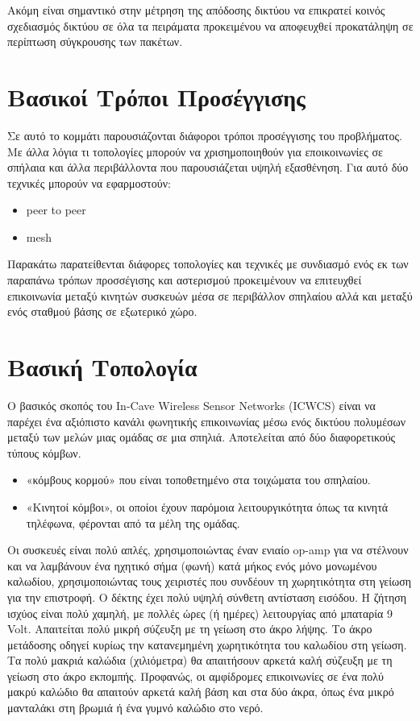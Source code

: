 \documentclass[12pt]{article}
\begin{document}
\begin{multicols*}{2}
        Ακόμη είναι σημαντικό στην μέτρηση της απόδοσης δικτύου να επικρατεί κοινός
        σχεδιασμός δικτύου σε όλα τα πειράματα προκειμένου να αποφευχθεί προκατάληψη
        σε περίπτωση σύγκρουσης των πακέτων.

        
        
    \section{\normalsize \textsf{Βασικοί Τρόποι Προσέγγισης}} Σε αυτό το κομμάτι
        παρουσιάζονται διάφοροι τρόποι προσέγγισης του προβλήματος. Με άλλα λόγια τι
        τοπολογίες μπορούν να χρισημοποιηθούν για εποικοινωνίες σε σπήλαια και άλλα
        περιβάλλοντα που παρουσιάζεται υψηλή εξασθένηση. Για αυτό δύο τεχνικές μπορούν να
        εφαρμοστούν:
    \begin{itemize}
        \item peer to peer
        \item mesh
    \end{itemize}

    Παρακάτω παρατείθενται διάφορες τοπολογίες και τεχνικές με συνδιασμό ενός εκ των
    παραπάνω τρόπων προσσέγισης και αστερισμού προκειμένουν να επιτευχθεί επικοινωνία
    μεταξύ κινητών συσκευών μέσα σε περιβάλλον σπηλαίου αλλά και μεταξύ ενός σταθμού βάσης
    σε εξωτερικό χώρο.

    \section{\normalsize  \textsf{Βασική Τοπολογία}} Ο βασικός σκοπός του In-Cave Wireless
    Sensor Networks (ICWCS) είναι να παρέχει ένα αξιόπιστο κανάλι φωνητικής επικοινωνίας
    μέσω ενός δικτύου πολυμέσων μεταξύ των μελών μιας ομάδας σε μια σπηλιά. Αποτελείται
    από δύο διαφορετικούς τύπους κόμβων. 
    \begin{itemize}
        \item «κόμβους κορμού» που είναι τοποθετημένο στα τοιχώματα του σπηλαίου.
        \item «Κινητοί κόμβοι», οι οποίοι έχουν παρόμοια λειτουργικότητα όπως τα κινητά
        τηλέφωνα, φέρονται από τα μέλη της ομάδας.
    \end{itemize}

    Οι συσκευές είναι πολύ απλές, χρησιμοποιώντας έναν ενιαίο op-amp για να στέλνουν και
    να λαμβάνουν ένα ηχητικό σήμα (φωνή) κατά μήκος ενός μόνο μονωμένου καλωδίου,
    χρησιμοποιώντας τους χειριστές που συνδέουν τη χωρητικότητα στη γείωση για την
    επιστροφή. Ο δέκτης έχει πολύ υψηλή σύνθετη αντίσταση εισόδου. Η ζήτηση ισχύος είναι
    πολύ χαμηλή, με πολλές ώρες (ή ημέρες) λειτουργίας από μπαταρία 9 Volt. Απαιτείται
    πολύ μικρή σύζευξη με τη γείωση στο άκρο λήψης. Το άκρο μετάδοσης οδηγεί κυρίως την
    κατανεμημένη χωρητικότητα του καλωδίου στη γείωση. Τα πολύ μακριά καλώδια (χιλιόμετρα)
    θα απαιτήσουν αρκετά καλή σύζευξη με τη γείωση στο άκρο εκπομπής. Προφανώς, οι
    αμφίδρομες επικοινωνίες σε ένα πολύ μακρύ καλώδιο θα απαιτούν αρκετά καλή βάση και στα
    δύο άκρα, όπως ένα μικρό μανταλάκι στη βρωμιά ή ένα γυμνό καλώδιο στο νερό.


\end{multicols*}
\end{document}
